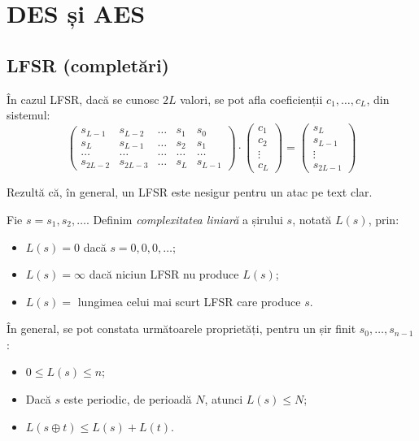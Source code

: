 \chapter{DES și AES}

\section{LFSR (completări)}

În cazul LFSR, dacă se cunosc $ 2L $ valori, se pot afla
coeficienții $ c_1, \dots, c_L $, din sistemul:
\[
  \begin{pmatrix}
    s_{L-1} & s_{L-2} & \dots & s_1 & s_0 \\
    s_L & s_{L-1} & \dots & s_2 & s_1 \\
    \dots & \dots & \dots & \dots & \dots \\
    s_{2L - 2} & s_{2L - 3} & \dots & s_L & s_{L - 1}
  \end{pmatrix} \cdot
  \begin{pmatrix}
    c_1 \\ c_2 \\ \vdots \\ c_L
  \end{pmatrix} =
  \begin{pmatrix}
    s_L \\ s_{L - 1} \\ \vdots \\ s_{2L - 1}
  \end{pmatrix}
\]

Rezultă că, în general, un LFSR este nesigur pentru un atac pe text clar.

\begin{definition}\label{def:complex-lin}
  Fie $ s = s_1, s_2, \dots $. Definim \emph{complexitatea liniară}
  a șirului $ s $, notată $ L(s) $, prin:
  \begin{itemize}
  \item $ L(s) = 0 $ dacă $ s = 0, 0, 0, \dots $;
  \item $ L(s) = \infty $ dacă niciun LFSR nu produce $ L(s) $;
  \item $ L(s) = $ lungimea celui mai scurt LFSR care produce $ s $.
  \end{itemize}
\end{definition}

În general, se pot constata următoarele proprietăți, pentru un șir finit
$ s_0, \dots, s_{n-1} $:
\begin{itemize}
\item $ 0 \leq L(s) \leq n $;
\item Dacă $ s $ este periodic, de perioadă $ N $, atunci $ L(s) \leq N $;
\item $ L(s \oplus t) \leq L(s) + L(t) $.
\end{itemize}

